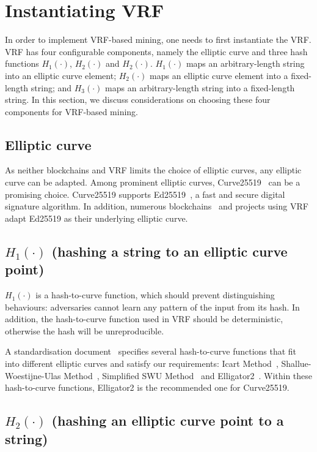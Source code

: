 \section{Instantiating VRF}

In order to implement VRF-based mining, one needs to first instantiate the VRF.
VRF has four configurable components, namely the elliptic curve and three hash functions $H_{1}(\cdot)$, $H_{2}(\cdot)$ and $H_{2}(\cdot)$.
$H_{1}(\cdot)$ maps an arbitrary-length string into an elliptic curve element;
$H_{2}(\cdot)$ maps an elliptic curve element into a fixed-length string; and
$H_{3}(\cdot)$ maps an arbitrary-length string into a fixed-length string.
In this section, we discuss considerations on choosing these four components for VRF-based mining.





\subsection{Elliptic curve}
As neither blockchains and VRF limits the choice of elliptic curves, any elliptic curve can be adapted.
Among prominent elliptic curves, Curve25519~\cite{} can be a promising choice.
Curve25519 supports Ed25519~\cite{}, a fast and secure digital signature algorithm.
In addition, numerous blockchains~\cite{} and projects using VRF~\cite{} adapt Ed25519 as their underlying elliptic curve.




\subsection{$H_{1}(\cdot)$ (hashing a string to an elliptic curve point)}
$H_{1}(\cdot)$ is a hash-to-curve function, which should prevent distinguishing behaviours: adversaries cannot learn any pattern of the input from its hash.
In addition, the hash-to-curve function used in VRF should be deterministic, otherwise the hash will be unreproducible.

A standardisation document~\cite{} specifies several hash-to-curve functions that fit into different elliptic curves and satisfy our requirements: Icart Method~\cite{}, Shallue-Woestijne-Ulas Method~\cite{}, Simplified SWU Method~\cite{} and Elligator2~\cite{}.
Within these hash-to-curve functions, Elligator2 is the recommended one for Curve25519.




\subsection{$H_{2}(\cdot)$ (hashing an elliptic curve point to a string)}

